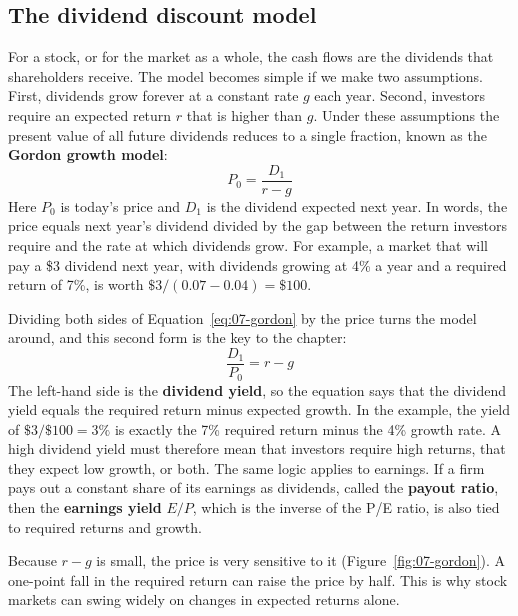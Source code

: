 \subsection{The dividend discount model}

For a stock, or for the market as a whole, the cash flows are the dividends that shareholders receive. The model becomes simple if we make two assumptions. First, dividends grow forever at a constant rate $g$ each year. Second, investors require an expected return $r$ that is higher than $g$. Under these assumptions the present value of all future dividends reduces to a single fraction, known as the \textbf{Gordon growth model}:
\begin{equation}
  P_0 = \frac{D_1}{r - g}
  \label{eq:07-gordon}
\end{equation}
Here $P_0$ is today's price and $D_1$ is the dividend expected next year. In words, the price equals next year's dividend divided by the gap between the return investors require and the rate at which dividends grow. For example, a market that will pay a \$3 dividend next year, with dividends growing at 4\% a year and a required return of 7\%, is worth $\$3/(0.07 - 0.04) = \$100$.

Dividing both sides of Equation~\eqref{eq:07-gordon} by the price turns the model around, and this second form is the key to the chapter:
\begin{equation}
  \frac{D_1}{P_0} = r - g
  \label{eq:07-gordon-yield}
\end{equation}
The left-hand side is the \textbf{dividend yield}, so the equation says that the dividend yield equals the required return minus expected growth. In the example, the yield of $\$3/\$100 = 3\%$ is exactly the 7\% required return minus the 4\% growth rate. A high dividend yield must therefore mean that investors require high returns, that they expect low growth, or both. The same logic applies to earnings. If a firm pays out a constant share of its earnings as dividends, called the \textbf{payout ratio}, then the \textbf{earnings yield} $E/P$, which is the inverse of the P/E ratio, is also tied to required returns and growth.

Because $r - g$ is small, the price is very sensitive to it (Figure~\ref{fig:07-gordon}). A one-point fall in the required return can raise the price by half. This is why stock markets can swing widely on changes in expected returns alone.

